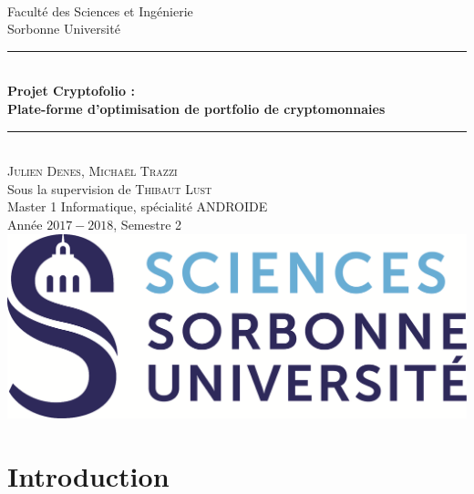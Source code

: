 \documentclass[a4paper, 10pt]{article}
\newcommand{\HRule}{\rule{\linewidth}{0.5mm}}
\begin{document}
\begin{titlepage}
\begin{center}
~\\[1cm]
\Large Faculté des Sciences et Ingénierie\\Sorbonne Université\\[3.5cm]
\HRule 
\\[0.4cm]{\huge \bfseries Projet Cryptofolio :\\[0.1cm] Plate-forme d’optimisation de portfolio de cryptomonnaies\\[0.4cm]}
\HRule \\[1cm] 
\Large \textsc{Julien Denes, Michaël Trazzi} \\[0.1cm]
\Large Sous la supervision de \textsc{Thibaut Lust}\\[2cm]
\Large Master 1 Informatique, spécialité ANDROIDE\\Année $2017-2018$, Semestre 2 \\[5cm]
\includegraphics[scale=0.3]{images/logo.png}
\end{center}
\end{titlepage}

\tableofcontents

\newpage
\section*{Introduction}
\label{sec:intro}
\end{document}
